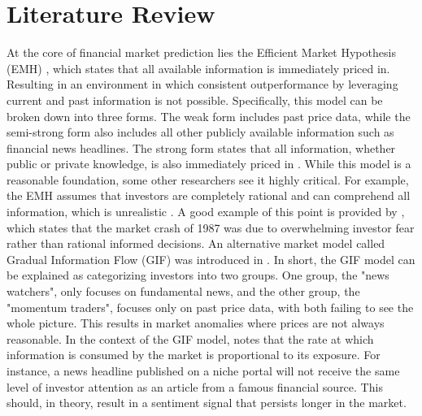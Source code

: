 \documentclass[Master,english,IEEE]{twbook}
\begin{document}
\chapter{Literature Review}
At the core of financial market prediction lies the Efficient Market Hypothesis (EMH) \cite{fama1965behavior}, which states that all available information is immediately priced in. Resulting in an environment in which consistent outperformance by leveraging current and past information is not possible. Specifically, this model can be broken down into three forms. The weak form includes past price data, while the semi-strong form also includes all other publicly available information such as financial news headlines. The strong form states that all information, whether public or private knowledge, is also immediately priced in \cite{emh1970}. While this model is a reasonable foundation, some other researchers see it highly critical. For example, the EMH assumes that investors are completely rational and can comprehend all information, which is unrealistic \cite{sul2017trading}. A good example of this point is provided by \cite{lawrence1997using}, which states that the market crash of 1987 was due to overwhelming investor fear rather than rational informed decisions. An alternative market model called Gradual Information Flow (GIF) was introduced in \cite{hong1999unified}. In short, the GIF model can be explained as categorizing investors into two groups. One group, the "news watchers", only focuses on fundamental news, and the other group, the "momentum traders", focuses only on past price data, with both failing to see the whole picture. This results in market anomalies where prices are not always reasonable. In the context of the GIF model, \cite{sul2017trading} notes that the rate at which information is consumed by the market is proportional to its exposure. For instance, a news headline published on a niche portal will not receive the same level of investor attention as an article from a famous financial source. This should, in theory, result in a sentiment signal that persists longer in the market.
\end{document}

